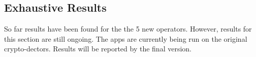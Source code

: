 \subsection{Exhaustive Results}
\label{ch5:sec:discussion}



So far results have been found for the the 5 new operators. However, results for this section are still ongoing. The apps are currently being run on the original crypto-dectors. Results will be reported by the final version.